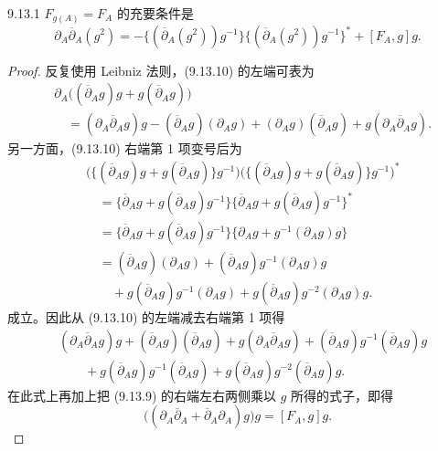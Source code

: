 \begin{lemma*}{9.13.1}
  $F_{g(A)}=F_A$ 的充要条件是
  \begin{equation}
    \partial_A\overline{\partial}_A(g^2)
    =-\bigl\{(\overline{\partial}_A(g^2))g^{-1}\bigr\}\bigl\{(\overline{\partial}_A(g^2))g^{-1}\bigr\}^*
    +[F_A,g]g.
    \tag{9.13.10}
  \end{equation}
\end{lemma*}
\begin{proof}
  反复使用 Leibniz 法则，(9.13.10) 的左端可表为
  \begin{align*}
    &\partial_A\bigl((\overline{\partial}_Ag)g+g(\overline{\partial}_Ag)\bigr)\\
    &\quad=(\partial_A\overline{\partial}_Ag)g-(\overline{\partial}_Ag)(\partial_Ag)+(\partial_Ag)(\overline{\partial}_Ag)+g(\partial_A\overline{\partial}_Ag).
  \end{align*}
  另一方面，(9.13.10) 右端第 1 项变号后为
  \begin{align*}
    &\bigl(\{(\overline{\partial}_Ag)g+g(\overline{\partial}_Ag)\}g^{-1}\bigr)
     \bigl(\{(\overline{\partial}_Ag)g+g(\overline{\partial}_Ag)\}g^{-1}\bigr)^*\\
    &\quad=\bigl\{\overline{\partial}_Ag+g(\overline{\partial}_Ag)g^{-1}\bigr\}
      \bigl\{\overline{\partial}_Ag+g(\overline{\partial}_Ag)g^{-1}\bigr\}^*\\
    &\quad=\bigl\{\overline{\partial}_Ag+g(\overline{\partial}_Ag)g^{-1}\bigr\}
      \bigl\{\partial_Ag+g^{-1}(\partial_Ag)g\bigr\}\\
    &\quad=(\overline{\partial}_Ag)(\partial_Ag)+(\overline{\partial}_Ag)g^{-1}(\partial_Ag)g\\
    &\qquad+g(\overline{\partial}_Ag)g^{-1}(\partial_Ag)+g(\overline{\partial}_Ag)g^{-2}(\partial_Ag)g.
  \end{align*}
  成立。因此从 (9.13.10) 的左端减去右端第 1 项得
  \begin{align*}
    &(\partial_A\overline{\partial}_Ag)g+(\overline{\partial}_Ag)(\overline{\partial}_Ag)+g(\partial_A\overline{\partial}_Ag)+(\overline{\partial}_Ag)g^{-1}(\overline{\partial}_Ag)g\\
    &\qquad+g(\overline{\partial}_Ag)g^{-1}(\overline{\partial}_Ag)+g(\overline{\partial}_Ag)g^{-2}(\overline{\partial}_Ag)g.
  \end{align*}
  在此式上再加上把 (9.13.9) 的右端左右两侧乘以 $g$ 所得的式子，即得
  \begin{equation}
    \bigl((\partial_A\overline{\partial}_A+\overline{\partial}_A\partial_A)g\bigr)g=[F_A,g]g.
    \tag{9.13.11}
  \end{equation}
\end{proof}

